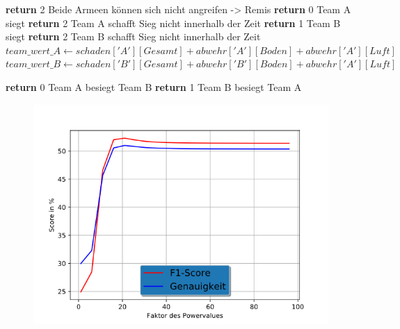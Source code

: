\begin{algorithmic}[1]
	\State \textbf{return} 2 \Comment Beide Armeen können sich nicht angreifen -> Remis
\EndIf
{}
		\State \textbf{return} 0 \Comment Team A siegt
	\Else 
		\State \textbf{return} 2 \Comment Team A schafft Sieg nicht innerhalb der Zeit
	\EndIf
\EndIf
{}
	\State \textbf{return} 1 \Comment Team B siegt
\Else 
	\State \textbf{return} 2 \Comment Team B schafft Sieg nicht innerhalb der Zeit
\EndIf
\EndIf
\State $team\_wert\_A \leftarrow schaden['A'][Gesamt] + abwehr['A'][Boden] + abwehr['A'][Luft]$
\State $team\_wert\_B \leftarrow schaden['B'][Gesamt] + abwehr['B'][Boden] + abwehr['A'][Luft]$

	\State \textbf{return} 0 \Comment Team A besiegt Team B
\Else
	\State \textbf{return} 1 \Comment Team B besiegt Team A
\EndIf
\EndProcedure
\end{algorithmic}


\begin{figure}[H]
\centering
\includegraphics[scale=0.8]{pictures/konstantenVollesModell}
\label{fig:konstante_baseline}
\end{figure}
 
